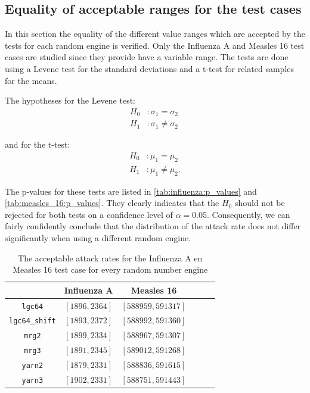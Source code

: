 \documentclass{acmart}
\begin{document}
\subsection{Equality of acceptable ranges for the test cases}

In this section the equality of the different value ranges which are accepted by the tests for each random engine is verified. Only the Influenza A and Measles 16 test cases are studied since they provide have a variable range. The tests are done using a Levene test for the standard deviations and a t-test for related samples for the means.

The hypotheses for the Levene test:
\[
\begin{aligned}
 H_0 &: \sigma_1 = \sigma_2\\
 H_1 &: \sigma_1 \ne \sigma_2\
\end{aligned}
\]

and for the t-test:
\[
\begin{aligned}
 H_0 &: \mu_1 = \mu_2  \\
 H_1 &: \mu_1 \ne \mu_2.
\end{aligned}
\]

The p-values for these tests are listed in \cref{tab:influenza:p_values} and \cref{tab:measles_16:p_values}. They clearly indicates that the \(H_0\) should not be rejected for both tests on a confidence level of $\alpha = 0.05$. Consequently, we can fairly confidently conclude that the distribution of the attack rate does not differ significantly when using a different random engine.


\begin{table}[!hbt]
    \centering
    \bgroup
    \def\arraystretch{2}
    \begin{tabular}{c|c|c|c|c|c}
                                & \textbf{Influenza A}  & \textbf{Measles 16} \\ \hline
        \texttt{lgc64}          & \([1896, 2364]\)       & \([588959, 591317]\) \\
        \texttt{lgc64\_shift}   & \([1893, 2372]\)       & \([588992, 591360]\) \\
        \texttt{mrg2}           & \([1899, 2334]\)       & \([588967, 591307]\) \\
        \texttt{mrg3}           & \([1891, 2345]\)       & \([589012, 591268]\) \\
        \texttt{yarn2}          & \([1879, 2331]\)       & \([588836, 591615]\) \\
        \texttt{yarn3}          & \([1902, 2331]\)       & \([588751, 591443]\) \\
    \end{tabular}
    \egroup
    \caption{The acceptable attack rates for the Influenza A en Measles 16 test case for every random number engine}
    \label{tab:ranges_engines}
\end{table}
\end{document}
